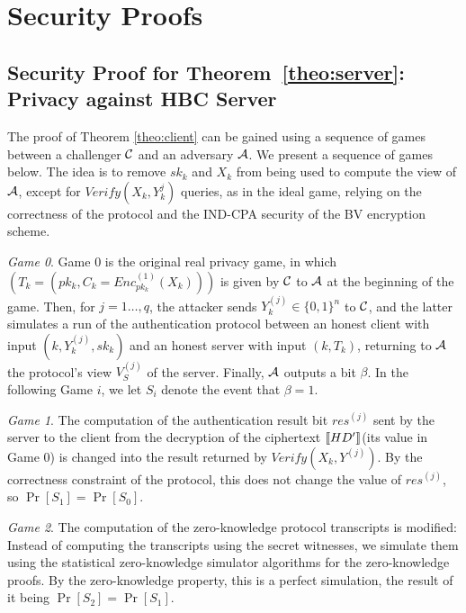 \section{Security Proofs}
\label{append:Proofs}
\subsection{Security Proof for Theorem~\ref{theo:server}: Privacy against HBC Server}
\label{append:ProofsPrivacy }

The proof of Theorem \ref{theo:client} can be gained using a sequence of games between a challenger $\mathcal{C}$ and
an adversary $\mathcal{A}$. We present a sequence of games below. The idea is to remove $sk_k$ and $X_k$ from being
used to compute the view of $\mathcal{A}$, except for $Verify(X_k,Y_k^{j})$ queries, as in the ideal game, relying on the
correctness of the protocol and the IND-CPA security of the BV encryption scheme.

\textit{Game 0}. Game 0 is the original real privacy game, in which $(T_k =(pk_k, C_k = Enc^{(1)}_{pk_k}(X_k)))$ is
given by $\mathcal{C}$ to $\mathcal{A}$ at the beginning of the game. Then, for $j=1\ldots,q$, the attacker sends
$Y_k^{(j)} \in \{0,1\}^n$ to $\mathcal{C}$, and the latter simulates a run of the authentication protocol between an
honest client with input $(k,Y_k^{(j)}, sk_k)$ and an honest server with input $(k,T_k)$, returning to $\mathcal{A}$ the
protocol's view $V^{(j)}_S$ of the server. Finally, $\mathcal{A}$ outputs a bit $\beta$. In the following Game $i$, we let
$S_i$ denote the event that $\beta=1$.

\textit{Game 1}. The computation of the authentication result bit $res^{(j)}$ sent by the server to the client
from the decryption of the ciphertext \(\left\llbracket HD'\right\rrbracket\)(its value in Game 0) is changed into the result returned by $Verify(X_k,
Y^{(j)})$. By the correctness constraint of the protocol, this does not change the value of $res^{(j)}$, so $\Pr[S_1] = \Pr[S_0]$.

\textit{Game 2}. The computation of the zero-knowledge protocol transcripts is modified: Instead of computing the
transcripts using the secret witnesses, we simulate them using the statistical zero-knowledge simulator algorithms for
the zero-knowledge proofs. By the zero-knowledge property, this is a perfect simulation, the result of it being $\Pr[S_2]=
\Pr[S_1]$.

